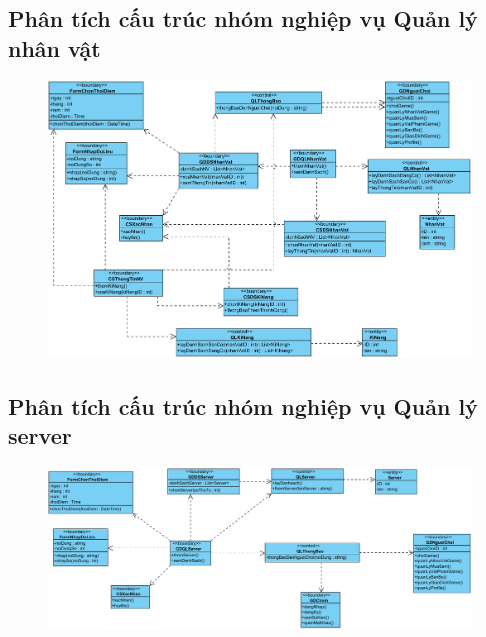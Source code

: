 \documentclass[3p]{elsarticle}
\begin{document}
\subsection{Phân tích cấu trúc nhóm nghiệp vụ Quản lý nhân vật}
\begin{figure}[!htbp]
	\hspace*{-.5in}
	\centering
	\includegraphics[scale=.55]{images/structure-pdfs/admin/qlNhanVat.pdf}
\end{figure}
\newpage

\subsection{Phân tích cấu trúc nhóm nghiệp vụ Quản lý server}
\begin{figure}[!htbp]
	\hspace*{-.5in}
	\centering
	\includegraphics[scale=.5]{images/structure-pdfs/admin/qlServer.pdf}
\end{figure}
\newpage
\end{document}
